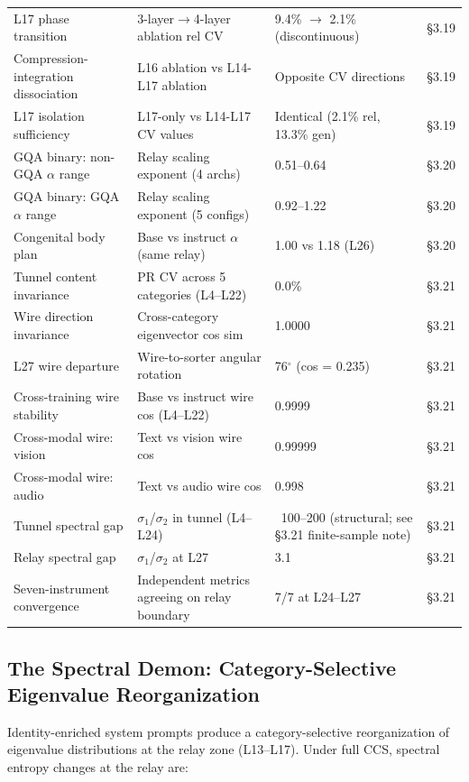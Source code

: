 \documentclass[11pt]{article}
\begin{document}
\begin{table}[h]
\begin{tabular}{|l|l|l|l|}
L17 phase transition & 3-layer$\rightarrow$4-layer ablation rel CV & 9.4\% $\rightarrow$ 2.1\% (discontinuous) & §3.19 \\
Compression-integration dissociation & L16 ablation vs L14-L17 ablation & Opposite CV directions & §3.19 \\
L17 isolation sufficiency & L17-only vs L14-L17 CV values & Identical (2.1\% rel, 13.3\% gen) & §3.19 \\
GQA binary: non-GQA $\alpha$ range & Relay scaling exponent (4 archs) & 0.51–0.64 & §3.20 \\
GQA binary: GQA $\alpha$ range & Relay scaling exponent (5 configs) & 0.92–1.22 & §3.20 \\
Congenital body plan & Base vs instruct $\alpha$ (same relay) & 1.00 vs 1.18 (L26) & §3.20 \\
Tunnel content invariance & PR CV across 5 categories (L4–L22) & 0.0\% & §3.21 \\
Wire direction invariance & Cross-category eigenvector cos sim & 1.0000 & §3.21 \\
L27 wire departure & Wire-to-sorter angular rotation & 76$^\circ$ (cos = 0.235) & §3.21 \\
Cross-training wire stability & Base vs instruct wire cos (L4–L22) & 0.9999 & §3.21 \\
Cross-modal wire: vision & Text vs vision wire cos & 0.99999 & §3.21 \\
Cross-modal wire: audio & Text vs audio wire cos & 0.998 & §3.21 \\
Tunnel spectral gap & $\sigma$$_1$/$\sigma$$_2$ in tunnel (L4–L24) & ~100–200 (structural; see §3.21 finite-sample note) & §3.21 \\
Relay spectral gap & $\sigma$$_1$/$\sigma$$_2$ at L27 & 3.1 & §3.21 \\
Seven-instrument convergence & Independent metrics agreeing on relay boundary & 7/7 at L24–L27 & §3.21 \\
\hline
\end{tabular}
\end{table}

\subsection{The Spectral Demon: Category-Selective Eigenvalue Reorganization}

Identity-enriched system prompts produce a category-selective reorganization of eigenvalue distributions at the relay zone (L13–L17). Under full CCS, spectral entropy changes at the relay are:
\end{document}
